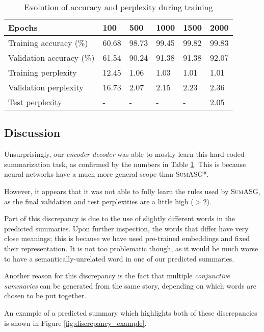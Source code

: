 \begin{table}[H]
\centering
\begin{tabular}{@{}llllll@{}}
\toprule
Epochs                & 100 & 500 & 1000 & 1500 & 2000 \\ \midrule
Training accuracy (\%)     & 60.68   & 98.73   & 99.45    & 99.82    & 99.83    \\
Validation accuracy (\%)   & 61.54   & 90.24   & 91.38    & 91.38    & 92.07    \\
Training perplexity   & 12.45   & 1.06   & 1.03    & 1.01    & 1.01    \\
Validation perplexity & 16.73   & 2.07   & 2.15    & 2.23    & 2.36    \\
Test perplexity & -   & -   & -    & -    & 2.05    \\ \bottomrule
\end{tabular}
\caption{Evolution of accuracy and perplexity during training}
\label{table:training_metrics}
\end{table}

\subsection*{Discussion}

Unsurprisingly, our \textit{encoder-decoder} was able to mostly learn this hard-coded summarization task, as confirmed by the numbers in Table \ref{table:training_metrics}. This is because neural networks have a much more general scope than \textsc{SumASG*}.

However, it appears that it was not able to fully learn the rules used by \textsc{SumASG}, as the final validation and test perplexities are a little high ($> 2$).

Part of this discrepancy is due to the use of slightly different words in the predicted summaries. Upon further inspection, the words that differ have very close meanings; this is because we have used pre-trained embeddings and fixed their representation. It is not too problematic though, as it would be much worse to have a semantically-unrelated word in one of our predicted summaries.

Another reason for this discrepancy is the fact that multiple \textit{conjunctive summaries} can be generated from the same story, depending on which words are chosen to be put together.

An example of a predicted summary which highlights both of these discrepancies is shown in Figure \ref{fig:discrepancy_example}.

